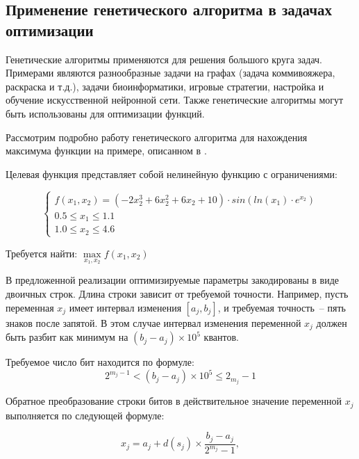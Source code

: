 \subsection{Применение генетического алгоритма в задачах оптимизации}
\label{sec:1d}

Генетические алгоритмы применяются для решения большого круга задач.
Примерами являются разнообразные задачи на графах (задача коммивояжера, раскраска и т.д.),
задачи биоинформатики, игровые стратегии, настройка и обучение искусственной нейронной сети.
Также генетические алгоритмы могут быть использованы для оптимизации функций.

Рассмотрим подробно работу генетического алгоритма для нахождения максимума функции на
примере, описанном в \cite{Rotshtein1999}.

Целевая функция представляет собой нелинейную функцию с ограничениями:

\begin{equation}
  \left \{
    \begin{array}{ll}
    f(x_{1}, x_{2}) = (-2x_{2}^{3} + 6x_{2}^{2} + 6x_{2} + 10) \cdot sin(ln(x_{1})\cdot e^{x_{2}}) \\
    0.5 \leq x_{1} \leq 1.1 \\
    1.0 \leq x_{2} \leq 4.6
    \end{array}
  \right .
\end{equation}

Требуется найти: $\max\limits_{x_{1}, x_{2}} f(x_1, x_2)$

В предложенной реализации оптимизируемые параметры закодированы в виде двоичных строк. Длина строки
зависит от требуемой точности. Например, пусть переменная $x_{j}$ имеет интервал изменения $[a_j, b_j]$,
и требуемая точность~-- пять знаков после запятой. В этом случае интервал изменения переменной $x_j$
должен быть разбит как минимум на $(b_j - a_j) \times 10^{5}$ квантов.

Требуемое число бит находится по формуле:
\begin{equation}
  2^{m_j -1} < (b_j - a_j) \times 10^{5} \leq 2_{m_j} -1
\end{equation}

Обратное преобразование строки битов в действительное значение переменной $x_j$ выполняется по
следующей формуле:

\begin{equation}
  x_j = a_j + d(s_j) \times \frac{b_j - a_j}{2^{m_j} - 1},
\end{equation}

